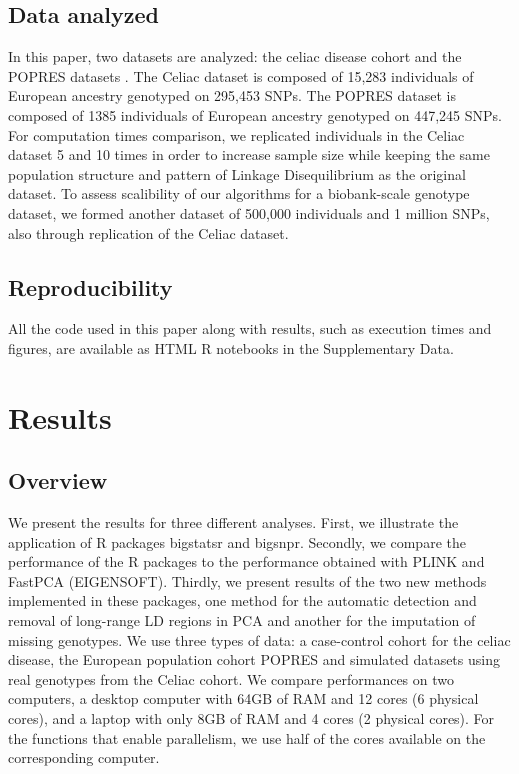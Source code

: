 \documentclass{bioinfo}
\begin{document}
\begin{methods}
\subsection{Data analyzed}

In this paper, two datasets are analyzed: the celiac disease cohort and the POPRES datasets \cite[]{Dubois2010,Nelson2008}. The Celiac dataset is composed of 15,283 individuals of European ancestry genotyped on 295,453 SNPs. The POPRES dataset is composed of 1385 individuals of European ancestry genotyped on 447,245 SNPs.
For computation times comparison, we replicated individuals in the Celiac dataset 5 and 10 times in order to increase sample size while keeping the same population structure and pattern of Linkage Disequilibrium as the original dataset. To assess scalibility of our algorithms for a biobank-scale genotype dataset, we formed another dataset of 500,000 individuals and 1 million SNPs, also through replication of the Celiac dataset. \label{sec:rep}

\subsection{Reproducibility}

All the code used in this paper along with results, such as execution times and figures, are available as HTML R notebooks in the Supplementary Data.

\end{methods}

\section{Results}

\subsection{Overview}\label{sec:overview}

We present the results for three different analyses. First, we illustrate the application of R packages bigstatsr and bigsnpr. Secondly, we compare the performance of the R packages to the performance obtained with PLINK and FastPCA (EIGENSOFT). Thirdly, we present results of the two new methods implemented in these packages, one method for the automatic detection and removal of long-range LD regions in PCA and another for the imputation of missing genotypes. We use three types of data: a case-control cohort for the celiac disease, the European population cohort POPRES and simulated datasets using real genotypes from the Celiac cohort. We compare performances on two computers, a desktop computer with 64GB of RAM and 12 cores (6 physical cores), and a laptop with only 8GB of RAM and 4 cores (2 physical cores). For the functions that enable parallelism, we use half of the cores available on the corresponding computer.
\end{document}
